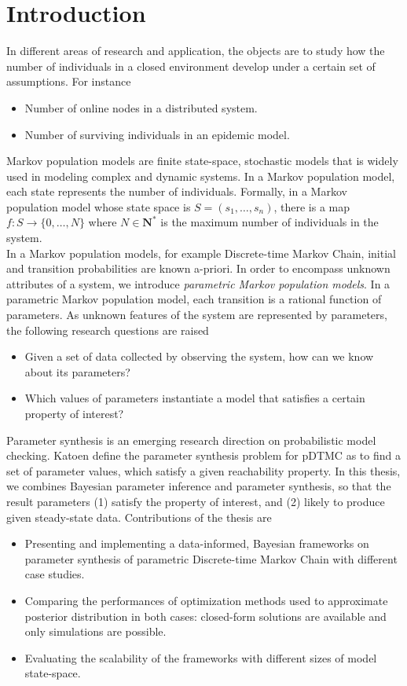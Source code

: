 \chapter{Introduction}
In different areas of research and application, the objects are to study how the number of
individuals in a closed environment develop under a certain set of assumptions. For instance
\begin{itemize}
      \item Number of online nodes in a distributed system.
      \item Number of surviving individuals in an epidemic model.
\end{itemize}
Markov population models \cite{kingman1969markov} are finite state-space, stochastic models that is
widely used in modeling complex and dynamic systems. In a Markov population model, each state
represents the number of individuals. Formally, in a Markov population model whose state space is
$S=(s_1,\ldots,s_n)$, there is a map $f:S\rightarrow\{0,\ldots,N\}$ where $N\in\mathbf{N}^*$ is the
maximum number of individuals in the system.\\
In a Markov population models, for example Discrete-time Markov Chain, initial and transition
probabilities are known a-priori. In order to encompass unknown attributes of a system, we introduce
\textit{parametric Markov population models}. In a parametric Markov population model, each
transition is a rational function of parameters. As unknown features of the system are represented
by parameters, the following research questions are raised
\begin{itemize}
      \item Given a set of data collected by observing the system, how can we know about its
            parameters?
      \item  Which values of parameters instantiate a model that satisfies a certain property of
            interest?
\end{itemize}
Parameter synthesis is an emerging research direction on probabilistic model checking. Katoen
\cite{katoen2016probabilistic} define the parameter synthesis problem for pDTMC as to find a set of
parameter values, which satisfy a given reachability property. In this thesis, we combines Bayesian
parameter inference and parameter synthesis, so that the result parameters (1) satisfy the property
of interest, and (2) likely to produce given steady-state data. Contributions of the thesis are
\begin{itemize}
      \item Presenting and implementing a data-informed, Bayesian frameworks on parameter synthesis
            of parametric Discrete-time Markov Chain with different case studies.
      \item Comparing the performances of optimization methods used to approximate posterior
            distribution in both cases: closed-form solutions are available and only simulations are
            possible.
      \item Evaluating the scalability of the frameworks with different sizes of model state-space.
\end{itemize}

